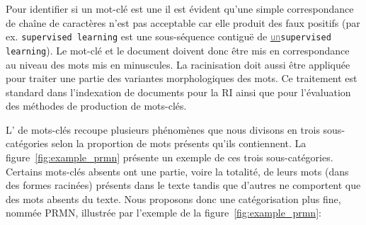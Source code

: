 Pour identifier si un mot-clé est une  il est évident qu'une simple correspondance de chaîne de caractères n'est pas acceptable car elle produit des faux positifs (par ex. \texttt{supervised learning} est une sous-séquence contiguë de  \texttt{\underline{\textcolor{gray}{un}}supervised learning}).
Le mot-clé et le document doivent donc être mis en correspondance au niveau des mots mis en minuscules.
La racinisation doit aussi être appliquée pour traiter une partie des variantes morphologiques des mots. Ce traitement est standard dans l'indexation de documents pour la RI ainsi que pour l'évaluation des méthodes de production de mots-clés.


\iffalse
\begin{figure}[ht!]
    \centering
    \inputminted[fontsize=\footnotesize]{python}{6_impact_ri/figures/code_prmu.py}
    \caption{Code python calculant les catégories fine PRMN d'un mot-clé (\texttt{kw}) étant donné un document (\texttt{doc}).}
    \label{fig:finer_category_code}
\end{figure}
\fi

L' de mots-clés recoupe plusieurs phénomènes que nous divisons en trois sous-catégories selon la proportion de mots présents qu'ils contiennent.
La figure~\ref{fig:example_prmn} présente un exemple de ces trois sous-catégories.
Certains mots-clés absents ont une partie, voire la totalité, de leurs mots (dans des formes racinées) présents dans le texte tandis que d'autres ne comportent que des mots absents du texte.
Nous proposons donc une catégorisation plus fine, nommée PRMN, illustrée par l'exemple de la figure~\ref{fig:example_prmn}:


